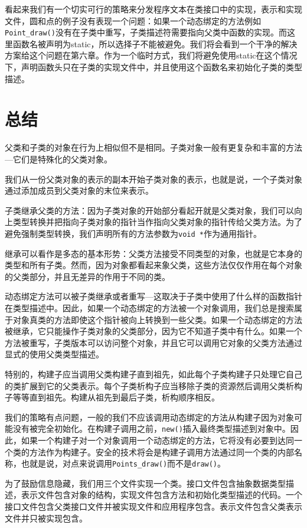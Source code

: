 看起来我们有一个切实可行的策略来分发程序文本在类接口中的实现，表示和实现文件，圆和点的例子没有表现一个问题：如果一个动态绑定的方法例如\verb|Point_draw()|没有在子类中重写，子类描述符需要指向父类中函数的实现。而这里函数名被声明为static，所以选择子不能被避免。我们将会看到一个干净的解决方案给这个问题在第六章。作为一个临时方式，我们将避免使用static在这个情况下，声明函数头只在子类的实现文件中，并且使用这个函数名来初始化子类的类型描述。

\section{总结}
父类和子类的对象在行为上相似但不是相同。子类对象一般有更复杂和丰富的方法---它们是特殊化的父类对象。

我们从一份父类对象的表示的副本开始子类对象的表示，也就是说，一个子类对象通过添加成员到父类对象的末位来表示。

子类继承父类的方法：因为子类对象的开始部分看起开就是父类对象，我们可以向上类型转换并把指向子类对象的指针当作指向父类对象的指针传给父类方法。为了避免强制类型转换，我们声明所有的方法参数为\verb|void *|作为通用指针。

继承可以看作是多态的基本形势：父类方法接受不同类型的对象，也就是它本身的类型和所有子类。然而，因为对象都看起来象父类，这些方法仅仅作用在每个对象的父类部分，并且无差异的作用于不同的类。

动态绑定方法可以被子类继承或者重写---这取决于子类中使用了什么样的函数指针在类型描述中。因此，如果一个动态绑定的方法被一个对象调用，我们总是搜索属于对象真类的方法即使这个指针被向上转换到一些父类。如果一个动态绑定的方法被继承，它只能操作子类对象的父类部分，因为它不知道子类中有什么。如果一个方法被重写，子类版本可以访问整个对象，并且它可以调用它对象的父类方法通过显式的使用父类类型描述。

特别的，构建子应当调用父类构建子直到祖先，如此每个子类构建子只处理它自己的类扩展到它的父类表示。每个子类析构子应当移除子类的资源然后调用父类析构子等等直到祖先。构建从祖先到最后子类，析构顺序相反。

我们的策略有点问题，一般的我们不应该调用动态绑定的方法从构建子因为对象可能没有被完全初始化。在构建子调用之前，\verb|new()|插入最终类型描述到对象中。因此，如果一个构建子对一个对象调用一个动态绑定的方法，它将没有必要到达同一个类的方法作为构建子。安全的技术将会是构建子调用方法通过同一个类的内部名称，也就是说，对点来说调用\verb|Points_draw()|而不是\verb|draw()|。

为了鼓励信息隐藏，我们用三个文件实现一个类。接口文件包含抽象数据类型描述，表示文件包含对象的结构，实现文件包含方法和初始化类型描述的代码。一个接口文件包含父类接口文件并被实现文件和应用程序包含。表示文件包含父类表示文件并只被实现包含。

